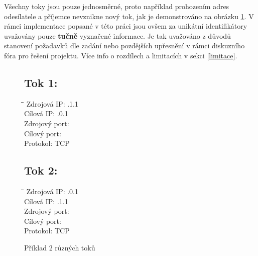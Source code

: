 \documentclass[11pt, a4paper, hidelinks]{article}[08.10.2023]
\begin{document}
    Všechny toky jsou pouze jednosměrné, proto například prohozením adres odesílatele a příjemce nevznikne
    nový tok, jak je demonstrováno na obrázku \ref{priklad1}. V rámci implementace popsané v této práci jsou ovšem za unikátní identifikátory uvažovány
    pouze \textbf{tučně} vyznačené informace. Je tak uvažováno z důvodů stanovení požadavků dle zadání nebo pozdějších upřesnění v rámci diskuzního fóra pro řešení projektu. Více info o rozdílech a limitacích v sekci \ref{limitace}.
    \vspace{2cm}

    \begin{figure}[h!]
        \begin{minipage}[t]{0.45\textwidth}
            \subsection*{Tok 1:}
            \begin{tabbing}
                \hspace*{4cm}\=\hspace*{4cm}\= \kill
                Zdrojová IP: .1.1 \\
                Cílová IP: .0.1 \\
                Zdrojový port:  \\
                Cílový port:  \\
                Protokol: \> TCP \\
            \end{tabbing}
        \end{minipage}
            \hfill
        \begin{minipage}[t]{0.45\textwidth}
            \subsection*{Tok 2:}
            \begin{tabbing}
                \hspace*{4cm}\=\hspace*{4cm}\= \kill
                Zdrojová IP: .0.1 \\
                Cílová IP: .1.1 \\
                Zdrojový port:  \\
                Cílový port:  \\
                Protokol: \> TCP \\
            \end{tabbing}
        \end{minipage}
        \caption{Příklad 2 různých toků}
        \label{priklad1}
    \end{figure}
\end{document}
